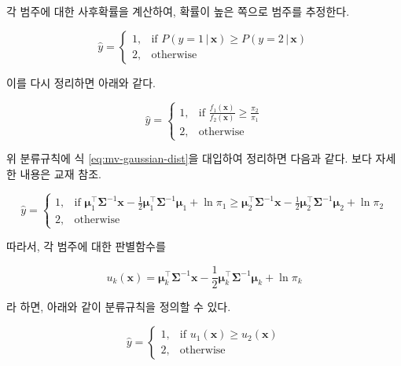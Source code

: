 \documentclass[
]{book}
\begin{document}
각 범주에 대한 사후확률을 계산하여, 확률이 높은 쪽으로 범주를 추정한다.

\begin{equation}
\hat{y} = \begin{cases}
    1, & \text{if } P(y = 1 \, | \, \mathbf{x}) \ge P(y = 2 \, | \, \mathbf{x})\\
    2, & \text{otherwise}
\end{cases}
\label{eq:lda-posterior-rule}
\end{equation}

이를 다시 정리하면 아래와 같다.

\begin{equation*}
\hat{y} = \begin{cases}
    1, & \text{if } \frac{f_1(\mathbf{x})}{f_2(\mathbf{x})} \ge \frac{\pi_2}{\pi_1}\\
    2, & \text{otherwise}
\end{cases}
\end{equation*}

위 분류규칙에 식 \eqref{eq:mv-gaussian-dist}을 대입하여 정리하면 다음과 같다. 보다 자세한 내용은 교재 \citep{jun2012datamining} 참조.

\begin{equation*}
\hat{y} = \begin{cases}
    1, & \text{if } \boldsymbol\mu_1^\top \boldsymbol\Sigma^{-1}\mathbf{x} - \frac{1}{2} \boldsymbol\mu_1^\top \boldsymbol\Sigma^{-1} \boldsymbol\mu_1 + \ln \pi_1 \ge \boldsymbol\mu_2^\top \boldsymbol\Sigma^{-1}\mathbf{x} - \frac{1}{2} \boldsymbol\mu_2^\top \boldsymbol\Sigma^{-1} \boldsymbol\mu_2 + \ln \pi_2  \\
    2, & \text{otherwise}
\end{cases}
\end{equation*}

따라서, 각 범주에 대한 판별함수를

\begin{equation}
u_k(\mathbf{x}) = \boldsymbol\mu_k^\top \boldsymbol\Sigma^{-1}\mathbf{x} - \frac{1}{2} \boldsymbol\mu_k^\top \boldsymbol\Sigma^{-1} \boldsymbol\mu_k + \ln \pi_k
\label{eq:lda-discriminant-function}
\end{equation}

라 하면, 아래와 같이 분류규칙을 정의할 수 있다.

\begin{equation}
\hat{y} = \begin{cases}
    1, & \text{if } u_1(\mathbf{x}) \ge u_2(\mathbf{x})  \\
    2, & \text{otherwise}
\end{cases}
\label{eq:lda-discriminant-rule}
\end{equation}
\end{document}

